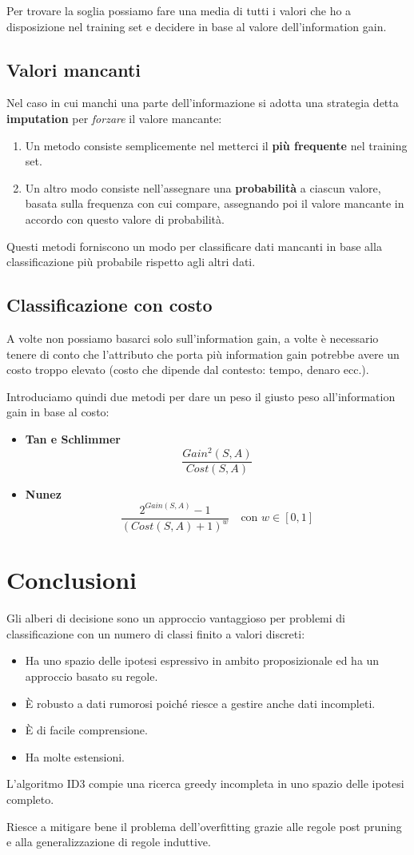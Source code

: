Per trovare la soglia possiamo fare una media di tutti i valori che ho a disposizione nel training set e decidere in
base al valore dell'information gain.

\subsection{Valori mancanti}
Nel caso in cui manchi una parte dell'informazione si adotta una strategia detta \textbf{imputation} per \emph{forzare}
il valore mancante:
\begin{enumerate}
	\item Un metodo consiste semplicemente nel metterci il \textbf{pi\`u frequente} nel training set.
	\item Un altro modo consiste nell'assegnare una \textbf{probabilit\`a} a ciascun valore, basata sulla frequenza con
	      cui compare, assegnando poi il valore mancante in accordo con questo valore di probabilit\`a.
\end{enumerate}
Questi metodi forniscono un modo per classificare dati mancanti in base alla classificazione pi\`u probabile rispetto
agli altri dati.

\subsection{Classificazione con costo}
A volte non possiamo basarci solo sull'information gain, a volte \`e necessario tenere di conto che l'attributo che
porta pi\`u information gain potrebbe avere un costo troppo elevato (costo che dipende dal contesto: tempo, denaro
ecc.).

Introduciamo quindi due metodi per dare un peso il giusto peso all'information gain in base al costo:
\begin{itemize}
	\item \textbf{Tan e Schlimmer}
	      \[ \frac{Gain^2(S, A)}{Cost(S, A)} \]
	\item \textbf{Nunez}
	      \[ \frac{2^{Gain(S, A)} - 1}{(Cost(S, A) + 1)^w} \quad \text{con } w \in [0, 1] \]
\end{itemize}

\section{Conclusioni}
Gli alberi di decisione sono un approccio vantaggioso per problemi di classificazione con un numero di classi finito
a valori discreti:
\begin{itemize}
	\item Ha uno spazio delle ipotesi espressivo in ambito proposizionale ed ha un approccio basato su regole.
	\item \`E robusto a dati rumorosi poich\'e riesce a gestire anche dati incompleti.
	\item \`E di facile comprensione.
	\item Ha molte estensioni.
\end{itemize}
L'algoritmo ID3 compie una ricerca greedy incompleta in uno spazio delle ipotesi completo.

Riesce a mitigare bene il problema dell'overfitting grazie alle regole post pruning e alla generalizzazione di regole
induttive.